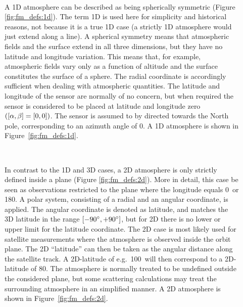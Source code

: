 \begin{description}
  
\item[\,\,\,] A 1D atmosphere can be described as being
  spherically symmetric (Figure \ref{fig:fm_defs:1d}). The term 1D is used here
  for simplicity and historical reasons, not because it is a true 1D case (a
  strictly 1D atmosphere would just extend along a line). A spherical symmetry
  means that atmospheric fields and the surface extend in all three dimensions,
  but they have no latitude and longitude variation. This means that, for
  example, atmospheric fields vary only as a function of altitude and the
  surface constitutes the surface of a sphere. The radial coordinate is
  accordingly sufficient when dealing with atmospheric quantities. The latitude
  and longitude of the sensor are normally of no concern, but when required the
  sensor is considered to be placed at latitude and longitude zero
  $([\alpha,\beta]=[0,0])$. The sensor is assumed to by directed towards
  the North pole, corresponding to an azimuth angle of 0\degree. A 1D
  atmosphere is shown in Figure~\ref{fig:fm_defs:1d}.
  
\item[\,\,\,] In contrast to the 1D and 3D cases, a 2D atmosphere
  is only strictly defined inside a plane (Figure \ref{fig:fm_defs:2d}). More
  in detail, this case be seen as observations restricted to the plane where
  the longitude equals 0\degree\ or 180\degree. A polar system, consisting of a radial and an angular coordinate, is
  applied. The angular coordinate is denoted as latitude, and matches the 3D
  latitude in the range $[-90^\circ,+90^\circ]$, but for 2D there is no lower
  or upper limit for the latitude coordinate. The 2D case is most likely used
  for satellite measurements where the atmosphere is observed inside the orbit
  plane. The 2D ``latitude'' can then be taken as the angular distance along
  the satellite track. A 2D-latitude of e.g.\ 100\degree\ will then correspond
  to a 2D-latitude of 80\degree. The atmosphere is normally treated to be
  undefined outside the considered plane, but some scattering calculations may
  treat the surrounding atmosphere in an simplified manner. A 2D atmosphere is
  shown in Figure~\ref{fig:fm_defs:2d}.


\end{description}
